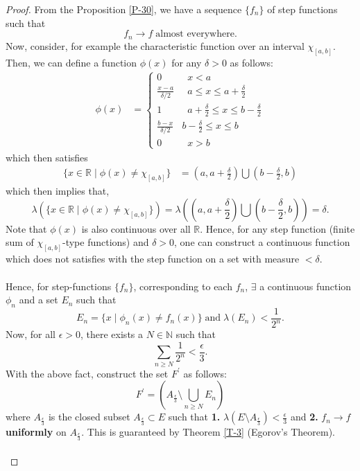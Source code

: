 \documentclass{article}
\theoremstyle{definition}
\theoremstyle{remark}
\theoremstyle{definition}
\theoremstyle{definition}
\theoremstyle{definition}
\newcommand{\bunion}{\bigcup}
\newcommand{\where}{\;\vert\;}
\newcommand{\R}{\mathbb{R}}
\newcommand{\N}{\mathbb{N}}
\newcommand{\lm}[1]{\lambda\left (#1\right )}
\begin{document}
\begin{proof}
	From the Proposition \ref{P-30}, we have a sequence $ \{f_n\} $ of step functions such that 
	\[f_n \longrightarrow f\;\text{almost everywhere.}\]
	Now, consider, for example the characteristic function over an interval $ \chi_{[a,b]} $. Then, we can define a function $ \phi(x) $ for any $ \delta > 0 $ as follows:
	\begin{equation*}
		\begin{split}
			\phi(x) &= \begin{cases}
				0 &\;\;x< a\\
				\frac{x-a}{\delta /2}&\;\; a\le x\le a+\frac{\delta}{2}\\
				1&\;\;a+\frac{\delta}{2} \le x \le b-\frac{\delta}{2}\\
				\frac{b-x}{\delta/2}& b-\frac{\delta}{2}\le x\le b\\
				0& \;\;x> b
			\end{cases}
		\end{split}
	\end{equation*}
which then satisfies 
\begin{equation*}
	\begin{split}
		\{x\in \R\where \phi(x) \neq \chi_{[a,b]}\} &= \left (a,a+\frac{\delta}{2}\right ) \bunion \left (b-\frac{\delta}{2},b\right )
	\end{split}
\end{equation*} 
which then implies that, 
\[\lm{\{x\in \R\where \phi(x) \neq \chi_{[a,b]}\}} = \lm{\left (a,a+\frac{\delta}{2}\right ) \bunion \left (b-\frac{\delta}{2},b\right )} = \delta.\]
Note that $ \phi(x) $ is also continuous over all $ \R $. Hence, for any step function (finite sum of $ \chi_{[a,b]} $-type functions) and $ \delta> 0 $, one can construct a continuous function which does not satisfies with the step function on a set with measure $ < \delta $.\\\\
Hence, for step-functions $ \{f_n\} $, corresponding to each $ f_n $, $ \exists $ a continuous function $ \phi_n $ and a set $ E_n $ such that
\[E_n = \{x\where \phi_n(x) \neq f_n(x)\}\;\text{and}\;\lm{E_n}<\frac{1}{2^{n}} .\]
Now, for all $ \epsilon > 0 $, there exists a $ N \in \N $ such that
\[\sum_{n\ge N} \frac{1}{2^{n}}< \frac{\epsilon}{3}.\]
With the above fact, construct the set $ F^{\prime} $ as follows:
\[F^{\prime} = \left (A_{\frac{\epsilon}{3}} \setminus \bunion_{n\ge N} E_n\right )\]
where $ A_{\frac{\epsilon}{3}} $ is the closed subset $ A_{\frac{\epsilon}{3}} \subset E$ such that \textbf{1.} $ \lm{E\setminus A_{\frac{\epsilon}{3}}} <\frac{\epsilon}{3}$ and \textbf{2.} $ f_n \longrightarrow f $ \textbf{uniformly} on $ A_{\frac{\epsilon}{3}} $. This is guaranteed by Theorem \ref{T-3} (Egorov's Theorem).\\\\

\end{proof}
\end{document}
